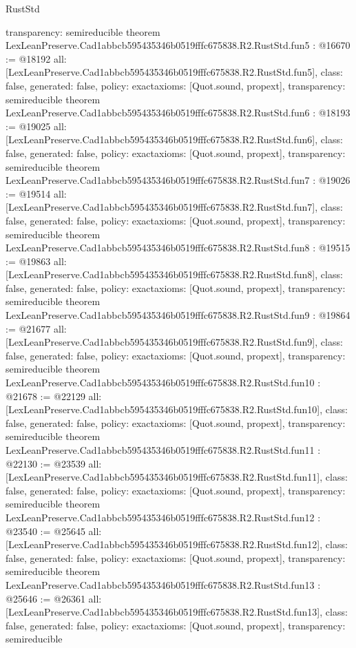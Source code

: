 \begin{lexlean}{RustStd}
\begin{coremodule}
{  transparency: semireducible
}
theorem LexLeanPreserve.Cad1abbcb595435346b0519fffc675838.R2.RustStd.fun5 : @16670 := @18192 {
  all: [LexLeanPreserve.Cad1abbcb595435346b0519fffc675838.R2.RustStd.fun5],
  class: false,
  generated: false,
  policy: exact{axioms: [Quot.sound, propext]},
  transparency: semireducible
}
theorem LexLeanPreserve.Cad1abbcb595435346b0519fffc675838.R2.RustStd.fun6 : @18193 := @19025 {
  all: [LexLeanPreserve.Cad1abbcb595435346b0519fffc675838.R2.RustStd.fun6],
  class: false,
  generated: false,
  policy: exact{axioms: [Quot.sound, propext]},
  transparency: semireducible
}
theorem LexLeanPreserve.Cad1abbcb595435346b0519fffc675838.R2.RustStd.fun7 : @19026 := @19514 {
  all: [LexLeanPreserve.Cad1abbcb595435346b0519fffc675838.R2.RustStd.fun7],
  class: false,
  generated: false,
  policy: exact{axioms: [Quot.sound, propext]},
  transparency: semireducible
}
theorem LexLeanPreserve.Cad1abbcb595435346b0519fffc675838.R2.RustStd.fun8 : @19515 := @19863 {
  all: [LexLeanPreserve.Cad1abbcb595435346b0519fffc675838.R2.RustStd.fun8],
  class: false,
  generated: false,
  policy: exact{axioms: [Quot.sound, propext]},
  transparency: semireducible
}
theorem LexLeanPreserve.Cad1abbcb595435346b0519fffc675838.R2.RustStd.fun9 : @19864 := @21677 {
  all: [LexLeanPreserve.Cad1abbcb595435346b0519fffc675838.R2.RustStd.fun9],
  class: false,
  generated: false,
  policy: exact{axioms: [Quot.sound, propext]},
  transparency: semireducible
}
theorem LexLeanPreserve.Cad1abbcb595435346b0519fffc675838.R2.RustStd.fun10 : @21678 := @22129 {
  all: [LexLeanPreserve.Cad1abbcb595435346b0519fffc675838.R2.RustStd.fun10],
  class: false,
  generated: false,
  policy: exact{axioms: [Quot.sound, propext]},
  transparency: semireducible
}
theorem LexLeanPreserve.Cad1abbcb595435346b0519fffc675838.R2.RustStd.fun11 : @22130 := @23539 {
  all: [LexLeanPreserve.Cad1abbcb595435346b0519fffc675838.R2.RustStd.fun11],
  class: false,
  generated: false,
  policy: exact{axioms: [Quot.sound, propext]},
  transparency: semireducible
}
theorem LexLeanPreserve.Cad1abbcb595435346b0519fffc675838.R2.RustStd.fun12 : @23540 := @25645 {
  all: [LexLeanPreserve.Cad1abbcb595435346b0519fffc675838.R2.RustStd.fun12],
  class: false,
  generated: false,
  policy: exact{axioms: [Quot.sound, propext]},
  transparency: semireducible
}
theorem LexLeanPreserve.Cad1abbcb595435346b0519fffc675838.R2.RustStd.fun13 : @25646 := @26361 {
  all: [LexLeanPreserve.Cad1abbcb595435346b0519fffc675838.R2.RustStd.fun13],
  class: false,
  generated: false,
  policy: exact{axioms: [Quot.sound, propext]},
  transparency: semireducible
}
\end{coremodule}
\end{lexlean}
